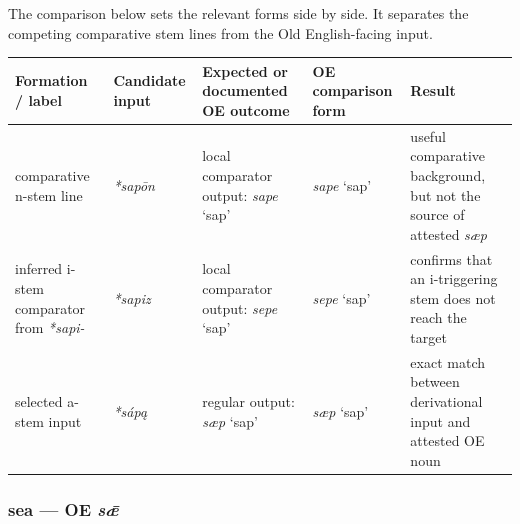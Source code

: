 \documentclass[
  british,
  a4paper,
]{article}
\newcounter{none} %
\begin{document}
The comparison below sets the relevant forms side by side. It separates
the competing comparative stem lines from the Old English-facing input.

{\def\LTcaptype{none} %
\begin{longtable}[]{@{}
  >{\raggedright\arraybackslash}p{}
  >{\raggedright\arraybackslash}p{}
  >{\raggedright\arraybackslash}p{}
  >{\raggedright\arraybackslash}p{}
  >{\raggedright\arraybackslash}p{}@{}}
\toprule\noalign{}
\begin{minipage}[b]{\linewidth}\raggedright
Formation / label
\end{minipage} & \begin{minipage}[b]{\linewidth}\raggedright
Candidate input
\end{minipage} & \begin{minipage}[b]{\linewidth}\raggedright
Expected or documented OE outcome
\end{minipage} & \begin{minipage}[b]{\linewidth}\raggedright
OE comparison form
\end{minipage} & \begin{minipage}[b]{\linewidth}\raggedright
Result
\end{minipage} \\
\midrule\noalign{}
\endhead
\bottomrule\noalign{}
\endlastfoot
comparative n-stem line & {\emph{*sapōn}} & local comparator output:
{\emph{sape}} `sap' & {\emph{sape}} `sap' & useful comparative
background, but not the source of attested \emph{sæp} \\
inferred i-stem comparator from \emph{*sapi-} & {\emph{*sapiz}} & local
comparator output: {\emph{sepe}} `sap' & {\emph{sepe}} `sap' & confirms
that an i-triggering stem does not reach the target \\
selected a-stem input & {\emph{*sápą}} & regular output: {\emph{sæp}}
`sap' & {\emph{sæp}} `sap' & exact match between derivational input and
attested OE noun \\
\end{longtable}
}

\subsubsection{\texorpdfstring{sea --- OE
\emph{sǣ}}{sea --- OE sǣ}}\label{sea-oe-sux1e3}
\end{document}
